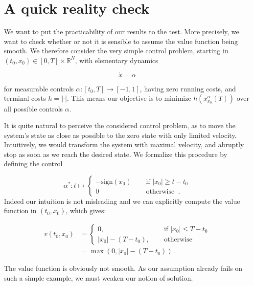 
	\section{A quick reality check}
	
	\label{non-smooth}
	
	We want to put the practicability of our results to the test. More precisely, we want to check whether or not it is sensible to assume the value function being smooth. We therefore consider the very simple control problem, starting in $ (t_0, x_0) \in \left[ 0 , T \right] \times \mathbb{R}^N $, with elementary dynamics
	
	\begin{equation*}
		\dot{x} = \alpha
	\end{equation*}
	
	for measurable controls $ \alpha : \left[ t_0, T \right] \to \left[-1, 1\right] $, having zero running costs, and terminal costs $ h = \lvert \cdot \rvert $. This means our objective is to minimize $ h(x^{\alpha}_{x_0}(T)) $ over all possible controls $ \alpha $.
	
	It is quite natural to perceive the considered control problem, as to move the system's state as close as possible to the zero state with only limited velocity. Intuitively, we would transform the system with maximal velocity, and abruptly stop as soon as we reach the desired state. We formalize this procedure by defining the control
	
	\begin{equation*}
		\alpha^{*} : t \mapsto \begin{cases}
		-\text{sign}(x_0) \quad &\text{ if } \lvert x_0 \rvert \geq t - t_0 \\
		0 \quad &\text{ otherwise } \ .
		\end{cases}
	\end{equation*}
	Indeed our intuition is not misleading and we can explicitly compute the value function in $ (t_0, x_0) $, which gives:
	
	\begin{align*}
		v(t_0, x_0) &= \begin{cases}
		0, \quad &\text{ if } |x_0| \leq T - t_0 \\
		|x_0| - (T - t_0), \quad &\text{ otherwise }
		\end{cases} \\
		&= \max(0, |x_0| - (T - t_0)) \ .
	\end{align*}
	
	The value function is obviously not smooth. As our assumption already fails on such a simple example, we must weaken our notion of solution.
	
